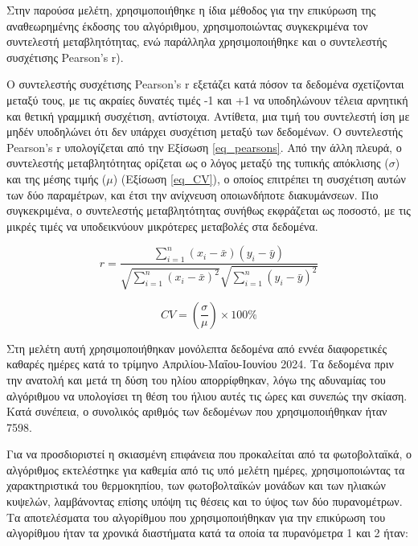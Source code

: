 \documentclass[12pt, a4paper]{report} %
\newcommand{\english}{\foreignlanguage{english}}
\begin{document}
Στην παρούσα μελέτη, χρησιμοποιήθηκε η ίδια μέθοδος για την επικύρωση της αναθεωρημένης έκδοσης του αλγόριθμου, χρησιμοποιώντας 
συγκεκριμένα τον συντελεστή μεταβλητότητας, ενώ παράλληλα χρησιμοποιήθηκε και ο συντελεστής συσχέτισης \english{Pearson’s r}).

Ο συντελεστής συσχέτισης \english{Pearson’s r} εξετάζει κατά πόσον τα δεδομένα σχετίζονται μεταξύ τους, με τις ακραίες δυνατές 
τιμές -1 και +1 να υποδηλώνουν τέλεια αρνητική και θετική γραμμική συσχέτιση, αντίστοιχα. Αντίθετα, μια τιμή του συντελεστή ίση 
με μηδέν υποδηλώνει ότι δεν υπάρχει συσχέτιση μεταξύ των δεδομένων. Ο συντελεστής \english{Pearson’s r} υπολογίζεται από την 
Εξίσωση \ref{eq_pearsons}. Από την άλλη πλευρά, ο συντελεστής μεταβλητότητας ορίζεται ως ο λόγος μεταξύ της τυπικής απόκλισης ($\sigma$)
και της μέσης τιμής ($\mu$) (Εξίσωση \ref{eq_CV}), ο οποίος επιτρέπει τη συσχέτιση αυτών των δύο παραμέτρων, και έτσι την ανίχνευση 
οποιωνδήποτε διακυμάνσεων. Πιο συγκεκριμένα, ο συντελεστής μεταβλητότητας συνήθως εκφράζεται ως ποσοστό, με τις μικρές τιμές να 
υποδεικνύουν μικρότερες μεταβολές στα δεδομένα.

\begin{equation}
    r = \frac{\sum_{i=1}^{n} (x_i - \bar{x})(y_i - \bar{y})}{\sqrt{\sum_{i=1}^{n} (x_i - \bar{x})^2} \sqrt{\sum_{i=1}^{n} (y_i - \bar{y})^2}}
    \label{eq_pearsons}
\end{equation}

\begin{equation}
    CV = \left( \frac{\sigma}{\mu} \right) \times 100\%
    \label{eq_CV}
\end{equation}

Στη μελέτη αυτή χρησιμοποιήθηκαν μονόλεπτα δεδομένα από εννέα διαφορετικές καθαρές ημέρες κατά το τρίμηνο Απριλίου-Μαΐου-Ιουνίου 
2024. Τα δεδομένα πριν την ανατολή και μετά τη δύση του ηλίου απορρίφθηκαν, λόγω της αδυναμίας του αλγόριθμου να υπολογίσει τη 
θέση του ήλιου αυτές τις ώρες και συνεπώς την σκίαση. Κατά συνέπεια, ο συνολικός αριθμός των δεδομένων που χρησιμοποιήθηκαν 
ήταν 7598.

Για να προσδιοριστεί η σκιασμένη επιφάνεια που προκαλείται από τα φωτοβολταϊκά, ο αλγόριθμος εκτελέστηκε για καθεμία από τις υπό 
μελέτη ημέρες, χρησιμοποιώντας τα χαρακτηριστικά του θερμοκηπίου, των φωτοβολταϊκών μονάδων και των ηλιακών κυψελών, λαμβάνοντας 
επίσης υπόψη τις θέσεις και το ύψος των δύο πυρανομέτρων. Τα αποτελέσματα του αλγορίθμου που χρησιμοποιήθηκαν για την επικύρωση 
του αλγορίθμου ήταν τα χρονικά διαστήματα κατά τα οποία τα πυρανόμετρα 1 και 2 ήταν:
\end{document}
